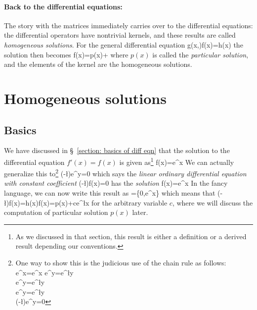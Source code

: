 \paragraph{Back to the differential equations:} The story with the matrices immediately carries over to the differential equations: the differential operators have nontrivial kernels, and these results are called \emph{homogeneous solutions}. For the general differential equation
\be 
g\left(x,\right)f(x)=h(x)
\ee 
the solution then becomes
\be 
f(x)=p(x)+\ker {}
\ee 
where $p(x)$ is called the \emph{particular solution}, and the elements of the kernel are the homogeneous solutions.

\section{Homogeneous solutions}
\subsection{Basics}
We have discussed in \S~\ref{section: basics of diff eqn} that the solution to the differential equation $f'(x)=f(x)$ is given as\footnote{As we discussed in that section, this result is either a definition or a derived result depending our conventions.}
\be 
f(x)=e^x
\ee 
We can actually generalize this to\footnote{
	One way to show this is the judicious use of the chain rule as follows:
	\be 
	e^{x}=e^{x} e^{\lambda y}=e^{\l y}\\
	e^{\lambda y}=e^{\l y}\\e^{\lambda y}=e^{\l y}
	\\\left(-\l\right)e^{\lambda y}=0
	\ee 
}
\be 
\left(-\l\right)e^{\lambda y}=0
\ee 
which says the \emph{linear ordinary differential equation with constant coefficient}
\be 
\left(-\l\right)f(x)=0
\ee 
has the \emph{solution}
\be 
f(x)=e^{\lambda x}
\ee 
In the fancy language, we can now write this result as 
\be 
\ker{}=\left\{0,e^{\lambda x}\right\}
\ee 
which means that
\be 
\left(-\l\right)f(x)=h(x)\quad\Rightarrow\quad f(x)=p(x)+ce^{\l x}
\ee 
for the arbitrary variable $c$, where we will discuss the computation of particular solution $p(x)$ later.

